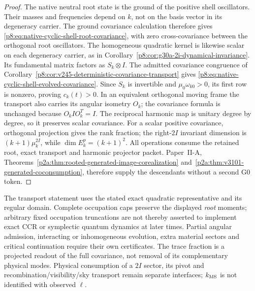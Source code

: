 \documentclass[12pt,a4paper]{article}
\begin{document}
\begin{proof}
The native neutral root state is the ground of the positive shell
oscillators.  Their masses and frequencies depend on \(k\), not on the
basis vector in its degeneracy carrier.  The ground covariance calculation
therefore gives \eqref{p8:eq:native-cyclic-shell-root-covariance}, with zero
cross-covariance between the orthogonal root oscillators.
The homogeneous quadratic kernel is likewise scalar on each degeneracy
carrier, as in Corollary~\ref{p8:cor:g30a-2i-dynamical-invariance}.
Its fundamental matrix factors as \(S_k\otimes I\).
The admitted covariance congruence of
Corollary~\ref{p8:cor:v245-deterministic-covariance-transport} gives
\eqref{p8:eq:native-cyclic-shell-evolved-covariance}.
Since \(S_k\) is invertible and \(\mu_0\omega_{k0}>0\), its first row is
nonzero, proving \(c_k(t)>0\).  In an equivalent orthogonal moving frame the
transport also carries its angular isometry \(O_k\); the covariance formula
is unchanged because \(O_k I O_k^T=I\).
The reciprocal harmonic map is unitary degree by degree, so it preserves
scalar covariance.  For a scalar positive covariance, orthogonal projection
gives the rank fraction; the right-\(2I\) invariant dimension is
\((k+1)\mu_k^{2I}\), while \(\dim E_k^p=(k+1)^2\).
All operations consume the retained root, exact transport and harmonic
projector packet.  Paper~II-A,
Theorems~\ref{p2a:thm:rooted-generated-image-corealization}
and~\ref{p2a:thm:v3101-generated-coconsumption}, therefore supply the
descendants without a second G0 token.
\end{proof}

The transport statement uses the stated exact quadratic representative and
its regular domain.  Complete occupation caps preserve the displayed
\emph{root} moments; arbitrary fixed occupation truncations are not thereby
asserted to implement exact CCR or symplectic quantum dynamics at later
times.  Partial angular admission, interacting or inhomogeneous evolution,
extra material sectors and critical continuation require their own
certificates.  The trace fraction is a projected readout of the full
covariance, not removal of its complementary physical modes.  Physical
consumption of a \(2I\) sector, its pivot and recombination/visibility/sky
transport remain separate interfaces; \(k_{\rm MS}\) is not identified with
observed \(\ell\).
\end{document}

